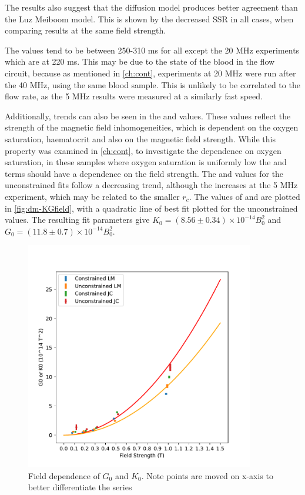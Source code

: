 The results also suggest that the diffusion model produces better agreement than the Luz Meiboom model.
This is shown by the decreased SSR in all cases, when comparing results at the same field strength.

The \TtwoO values tend to be between 250-310 ms for all except the 20 MHz experiments which are at 220 ms.
This may be due to the state of the blood in the flow circuit, because as mentioned in \autoref{ch:cont}, experiments at 20 MHz were run after the 40 MHz, using the same blood sample.
This is unlikely to be correlated to the flow rate, as the 5 MHz results were measured at a similarly fast speed.

Additionally, trends can also be seen in the \Kzero and \Gzero values.
These values reflect the strength of the magnetic field inhomogeneities, which is dependent on the oxygen saturation, haematocrit and also on the magnetic field strength.
While this property was examined in \autoref{ch:cont}, to investigate the dependence on oxygen saturation, in these samples where oxygen saturation is uniformly low the \Kzero and \Gzero terms should have a dependence on the field strength.
The \Kzero and \Gzero values for the unconstrained fits follow a decreasing trend, although the \Gzero increases at the 5 MHz experiment, which may be related to the smaller $r_c$.
The values of \Kzero and \Gzero are plotted in \autoref{fig:dm-KGfield}, with a quadratic line of best fit plotted for the unconstrained \Kzero values. The resulting fit parameters give $K_0 = (8.56\pm0.34) \times 10^{-14} B_0^2$ and $G_0 = (11.8\pm0.7) \times 10^{-14} B_0^2$.

\begin{figure}[h]
\centering
\includegraphics[width=10cm]{figures/diffmodels/G0K0field.pdf}
\caption[Field dependence of $G_0$ and $K_0$]{Field dependence of $G_0$ and $K_0$. Note points are moved on x-axis to better differentiate the series}
\label{fig:dm-KGfield}
\end{figure}

